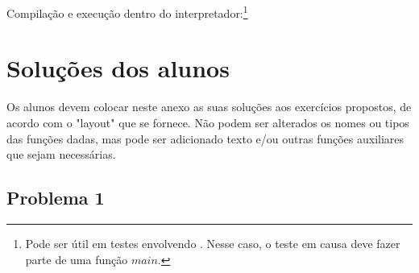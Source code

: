 \documentclass[a4paper]{article}
\newcommand{\Varid}[1]{\mathit{#1}}
\def\resethooks{%
  \global\let\SaveRestoreHook\empty
  \global\let\ColumnHook\empty}
\let\hspre\empty
\let\hspost\empty
\begin{document}
Compilação e execução dentro do interpretador:\footnote{Pode ser útil em testes
envolvendo . Nesse caso, o teste em causa deve fazer parte de uma função
\ensuremath{\Varid{main}}.}
\resethooks


\section{Soluções dos alunos}\label{sec:resolucao}
Os alunos devem colocar neste anexo as suas soluções aos exercícios
propostos, de acordo com o "layout" que se fornece. Não podem ser
alterados os nomes ou tipos das funções dadas, mas pode ser adicionado texto e/ou 
outras funções auxiliares que sejam necessárias.

\subsection*{Problema 1}
\end{document}
